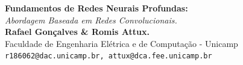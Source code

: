 \documentclass[a0,portrait]{a0poster}
\begin{document}
    \noindent
\begin{minipage}{0.73\linewidth}
\veryHuge \color{Indigo} \textbf{Fundamentos de Redes Neurais Profundas:}\\ \color{Black}
\Huge\textit{Abordagem Baseada em Redes Convolucionais.}\\[1cm] %
\huge \textbf{Rafael Gonçalves \& Romis Attux.}\\[0.2cm] %
    {\LARGE Faculdade de Engenharia Elétrica e de Computação - Unicamp\\
    \texttt{r186062@dac.unicamp.br, attux@dca.fee.unicamp.br}}
\end{minipage}
%
\begin{minipage}{0.27\linewidth}
    \centering
    \vspace{2cm}
    \def\svgwidth{0.6\columnwidth}
    
    \break\hfill\break
\end{minipage}

\vspace{1cm} %
\end{document}

